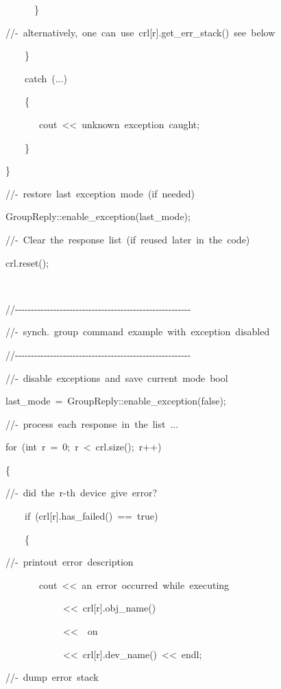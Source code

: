 \begin{lyxcode}
~~~~~~\}

//-~alternatively,~one~can~use~crl{[}r{]}.get\_err\_stack()~see~below

~~~~\}

~~~~catch~(...)

~~~~\{

~~~~~~~cout~<\textcompwordmark{}<~\textquotedbl{}unknown~exception~caught\textquotedbl{};

~~~~\}

\}

//-~restore~last~exception~mode~(if~needed)

GroupReply::enable\_exception(last\_mode);

//-~Clear~the~response~list~(if~reused~later~in~the~code)

crl.reset();

~

//-{}-{}-{}-{}-{}-{}-{}-{}-{}-{}-{}-{}-{}-{}-{}-{}-{}-{}-{}-{}-{}-{}-{}-{}-{}-{}-{}-{}-{}-{}-{}-{}-{}-{}-{}-{}-{}-{}-{}-{}-{}-{}-{}-{}-{}-{}-{}-{}-{}-{}-{}-{}-{}-{}-

//-~synch.~group~command~example~with~exception~disabled

//-{}-{}-{}-{}-{}-{}-{}-{}-{}-{}-{}-{}-{}-{}-{}-{}-{}-{}-{}-{}-{}-{}-{}-{}-{}-{}-{}-{}-{}-{}-{}-{}-{}-{}-{}-{}-{}-{}-{}-{}-{}-{}-{}-{}-{}-{}-{}-{}-{}-{}-{}-{}-{}-{}-

//-~disable~exceptions~and~save~current~mode~bool

last\_mode~=~GroupReply::enable\_exception(false);

//-~process~each~response~in~the~list~...

for~(int~r~=~0;~r~<~crl.size();~r++)

\{

//-~did~the~r-th~device~give~error?

~~~~if~(crl{[}r{]}.has\_failed()~==~true)

~~~~\{

//-~printout~error~description

~~~~~~~cout~<\textcompwordmark{}<~\textquotedbl{}an~error~occurred~while~executing~\textquotedbl{}

~~~~~~~~~~~~<\textcompwordmark{}<~crl{[}r{]}.obj\_name()

~~~~~~~~~~~~<\textcompwordmark{}<~\textquotedbl{}~on~\textquotedbl{}~

~~~~~~~~~~~~<\textcompwordmark{}<~crl{[}r{]}.dev\_name()~<\textcompwordmark{}<~endl;

//-~dump~error~stack


\end{lyxcode}
